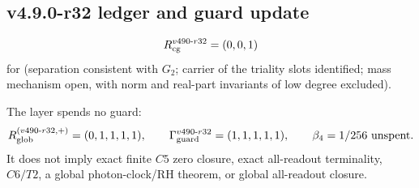 \subsection*{v4.9.0-r32 ledger and guard update}
\label{subsec:v490-r32-ledger-guard}

\[
R_{\rm cg}^{v490\text{-}r32}=(0,0,1)
\]
for (separation consistent with \(G_2\); carrier of the triality slots identified; mass mechanism open, with norm and
real-part invariants of low degree excluded).

The layer spends no guard:
\[
R_{\rm glob}^{(v490\text{-}r32,+)}=(0,1,1,1,1),
\qquad
\Gamma_{\rm guard}^{v490\text{-}r32}=(1,1,1,1,1),
\qquad
\beta_4=1/256\ \text{unspent}.
\]
It does not imply exact finite \(C5\) zero closure, exact all-readout terminality,
\(C6/T2\), a global photon-clock/RH theorem, or global all-readout closure.
